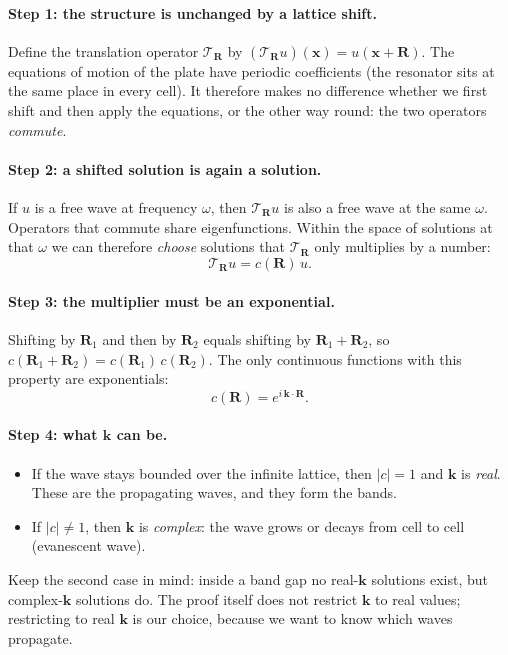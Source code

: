 \paragraph{Step 1: the structure is unchanged by a lattice shift.}
Define the translation operator $\mathcal{T}_{\mathbf{R}}$ by
$(\mathcal{T}_{\mathbf{R}} u)(\mathbf{x}) = u(\mathbf{x} + \mathbf{R})$.
The equations of motion of the plate have periodic coefficients (the resonator
sits at the same place in every cell). It therefore makes no difference
whether we first shift and then apply the equations, or the other way round:
the two operators \emph{commute}.

\paragraph{Step 2: a shifted solution is again a solution.}
If $u$ is a free wave at frequency $\omega$, then $\mathcal{T}_{\mathbf{R}}u$
is also a free wave at the same $\omega$. Operators that commute share
eigenfunctions. Within the space of solutions at that $\omega$ we can
therefore \emph{choose} solutions that $\mathcal{T}_{\mathbf{R}}$ only
multiplies by a number:
\begin{equation}
  \mathcal{T}_{\mathbf{R}} u = c(\mathbf{R})\, u .
\end{equation}

\paragraph{Step 3: the multiplier must be an exponential.}
Shifting by $\mathbf{R}_1$ and then by $\mathbf{R}_2$ equals shifting by
$\mathbf{R}_1 + \mathbf{R}_2$, so
$c(\mathbf{R}_1 + \mathbf{R}_2) = c(\mathbf{R}_1)\,c(\mathbf{R}_2)$.
The only continuous functions with this property are exponentials:
\begin{equation}
  c(\mathbf{R}) = e^{i\,\mathbf{k}\cdot\mathbf{R}} .
\end{equation}

\paragraph{Step 4: what $\mathbf{k}$ can be.}
\begin{itemize}
  \item If the wave stays bounded over the infinite lattice, then $|c| = 1$
        and $\mathbf{k}$ is \emph{real}. These are the propagating waves,
        and they form the bands.
  \item If $|c| \neq 1$, then $\mathbf{k}$ is \emph{complex}: the wave grows
        or decays from cell to cell (evanescent wave).
\end{itemize}
Keep the second case in mind: inside a band gap no real-$\mathbf{k}$
solutions exist, but complex-$\mathbf{k}$ solutions do. The proof itself does
not restrict $\mathbf{k}$ to real values; restricting to real $\mathbf{k}$ is
our choice, because we want to know which waves propagate.

